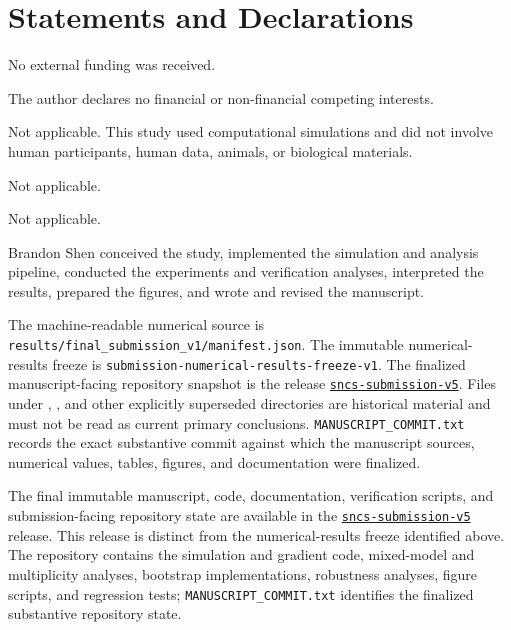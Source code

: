 \documentclass[pdflatex,sn-mathphys-num,Numbered]{sn-jnl}
\begin{document}
\backmatter

\section*{Statements and Declarations}

 No external funding was received.

 The author declares no financial or non-financial competing interests.

 Not applicable. This study used computational simulations and did not involve human participants, human data, animals, or biological materials.

 Not applicable.

 Not applicable.

 Brandon Shen conceived the study, implemented the simulation and analysis pipeline, conducted the experiments and verification analyses, interpreted the results, prepared the figures, and wrote and revised the manuscript.

 The machine-readable numerical source is \texttt{results/final\_submission\_v1/manifest.json}. The immutable numerical-results freeze is \nolinkurl{submission-numerical-results-freeze-v1}. The finalized manuscript-facing repository snapshot is the release \href{https://github.com/Brandon-Shen/few-qubit-qnn-snr/releases/tag/sncs-submission-v5}{\texttt{sncs-submission-v5}}. Files under , , and other explicitly superseded directories are historical material and must not be read as current primary conclusions. \texttt{MANUSCRIPT\_COMMIT.txt} records the exact substantive commit against which the manuscript sources, numerical values, tables, figures, and documentation were finalized.

 The final immutable manuscript, code, documentation, verification scripts, and submission-facing repository state are available in the \href{https://github.com/Brandon-Shen/few-qubit-qnn-snr/releases/tag/sncs-submission-v5}{\texttt{sncs-submission-v5}} release. This release is distinct from the numerical-results freeze identified above. The repository contains the simulation and gradient code, mixed-model and multiplicity analyses, bootstrap implementations, robustness analyses, figure scripts, and regression tests; \texttt{MANUSCRIPT\_COMMIT.txt} identifies the finalized substantive repository state.
\end{document}
